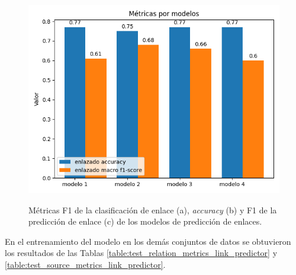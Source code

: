 \begin{figure}[h!]
\begin{center}
		\includegraphics[scale=.4]{Graphics/persuasive_essays_all_linked_all_relation_linked.png}\\
	\end{center}
	\caption{Métricas F1 de la clasificación de enlace (a), \emph{accuracy} (b) y
			F1 de la predicción de enlace (c) de los modelos de predicción de enlaces.}
	\label{fig:link_prediction_model_metrics}
\end{figure}

En el entrenamiento del modelo en los demás conjuntos de datos se obtuvieron los resultados de las Tablas 
\ref{table:test_relation_metrics_link_predictor} y \ref{table:test_source_metrics_link_predictor}.

\begin{table}[h!]
	\begin{center}
	\caption{Métricas de predicción de relaciones de las pruebas del predictor de enlace.}\label{table:test_relation_metrics_link_predictor}
	\end{center}
\end{table}

